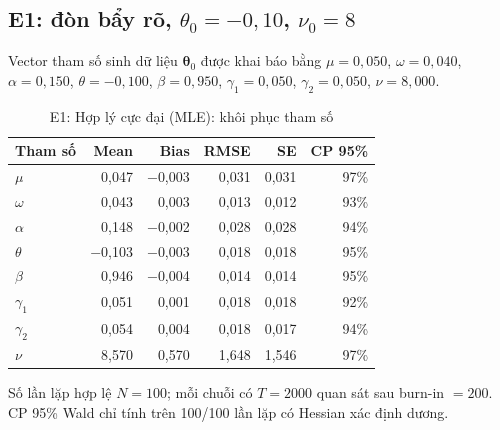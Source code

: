 \documentclass[11pt,a4paper]{article}
\begin{document}
\subsection{E1: \texorpdfstring{đòn bẩy rõ, $\theta_0=-0{,}10$, $\nu_0=8$}{don bay ro, theta0=-0,10, nu0=8}}
Vector tham số sinh dữ liệu $\boldsymbol\theta_0$ được khai báo bằng $\mu=0{,}050$, $\omega=0{,}040$, $\alpha=0{,}150$, $\theta=-0{,}100$, $\beta=0{,}950$, $\gamma_1=0{,}050$, $\gamma_2=0{,}050$, $\nu=8{,}000$.
\begin{table}[H]\centering\footnotesize
\caption{E1: Hợp lý cực đại (MLE): khôi phục tham số}\label{tab:E1-mle}
\begin{tabular}{l r r r r r}
\toprule
\textbf{Tham số} & \textbf{Mean} & \textbf{Bias} & \textbf{RMSE} & \textbf{SE} & \textbf{CP 95\%} \\
\midrule
$\mu$ & 0,047 & $-$0,003 & 0,031 & 0,031 & 97\% \\
$\omega$ & 0,043 & 0,003 & 0,013 & 0,012 & 93\% \\
$\alpha$ & 0,148 & $-$0,002 & 0,028 & 0,028 & 94\% \\
$\theta$ & $-$0,103 & $-$0,003 & 0,018 & 0,018 & 95\% \\
$\beta$ & 0,946 & $-$0,004 & 0,014 & 0,014 & 95\% \\
$\gamma_1$ & 0,051 & 0,001 & 0,018 & 0,018 & 92\% \\
$\gamma_2$ & 0,054 & 0,004 & 0,018 & 0,017 & 94\% \\
$\nu$ & 8,570 & 0,570 & 1,648 & 1,546 & 97\% \\
\bottomrule
\end{tabular}
\par\vspace{0.25em}\begin{minipage}{0.95\textwidth}\scriptsize Số lần lặp hợp lệ $N=100$; mỗi chuỗi có $T=2000$ quan sát sau burn-in $=200$. CP 95\% Wald chỉ tính trên 100/100 lần lặp có Hessian xác định dương.\end{minipage}
\end{table}
\end{document}
